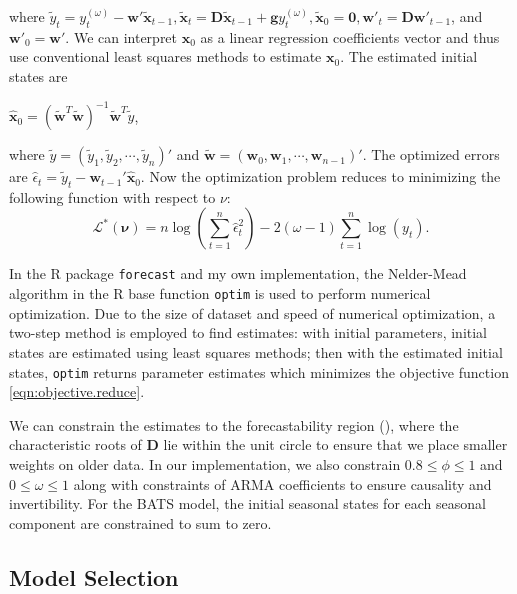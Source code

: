 \documentclass{uwstat572}
\begin{document}
where $ \tilde{y}_t=y_t^{(\omega)}- \textbf{w}' \tilde{\textbf{x}}_{t-1}, \tilde{\textbf{x}}_t=\textbf{D}\tilde{\textbf{x}}_{t-1}+\textbf{g}y_t^{(\omega)}, \tilde{\textbf{x}}_0=\textbf{0}, \textbf{w}'_{t}=\textbf{D}\textbf{w}'_{t-1}$, and $\textbf{w}'_{0}=\textbf{w}'$. We can interpret $\textbf{x}_0$ as a linear regression coefficients vector and thus use conventional least squares methods to estimate $\textbf{x}_0$. The estimated initial states are 
\begin{center}
$\displaystyle \hat{\textbf{x}}_0 = (\tilde{\textbf{w}}^T \tilde{\textbf{w}})^{-1}\tilde{\textbf{w}}^T \tilde{y}$,
\end{center}
where $\tilde{y}=(\tilde{y}_1 ,\tilde{y}_2  , \cdots , \tilde{y}_n )' $ and $\tilde{\textbf{w}}=(\textbf{w}_0 ,\textbf{w}_1  ,\cdots , \textbf{w}_{n-1})'$. The optimized errors are $\hat{\epsilon}_t=\tilde{y}_t-\textbf{w}_{t-1}' \hat{\textbf{x}}_0$. Now the optimization problem reduces to minimizing the following function with respect to $\nu$:
\begin{equation}
\mathcal{L}^{*}(\bm{\nu})=n \log (\sum\limits_{t=1}^n \hat{\epsilon}_t^2)-2(\omega-1) \sum\limits_{t=1}^n \log(y_t).
\label{eqn:objective.reduce}
\end{equation}

In the R package \texttt{forecast} and my own implementation, the Nelder-Mead algorithm in the R base function \texttt{optim} is used to perform numerical optimization. Due to the size of dataset and speed of numerical optimization, a two-step method is employed to find estimates: with initial parameters, initial states are estimated using least squares methods; then with the estimated initial states, \texttt{optim} returns parameter estimates which minimizes the objective function \ref{eqn:objective.reduce}. 

We can constrain the estimates to the forecastability region (\citet{hyndman2008admissible}), where the characteristic roots of $\textbf{D}$ lie within the unit circle to ensure that we place smaller weights on older data. In our implementation, we also constrain $0.8\leq \phi \leq 1$ and $0 \leq \omega \leq 1$ along with constraints of ARMA coefficients to ensure causality and invertibility. For the BATS model, the initial seasonal states for each seasonal component are constrained to sum to zero. 

\subsection{Model Selection}
\label{sec:selection}
\end{document}
